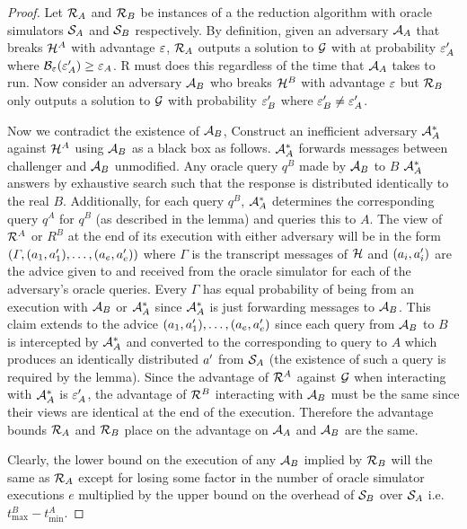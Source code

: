 \begin{proof}
  Let $\mathcal{R}_A$ and $\mathcal{R}_B$ be instances of a the reduction algorithm with oracle simulators $\mathcal{S}_A$ and $\mathcal{S}_B$ respectively.
  By definition, given an adversary $\mathcal{A}_A$ that breaks $\mathcal{H}^A$ with advantage $\varepsilon$, $\mathcal{R}_A$ outputs a solution to $\mathcal{G}$ with at probability $\varepsilon_A'$ where $\mathcal{B}_\varepsilon(\varepsilon_A') \geq \varepsilon_A$.
  R must does this regardless of the time that $\mathcal{A}_A$ takes to run.
  Now consider an adversary $\mathcal{A}_B$ who breaks $\mathcal{H}^B$ with advantage $\varepsilon$ but $\mathcal{R}_B$ only outputs a solution to $\mathcal{G}$ with probability $\varepsilon_B'$ where $\varepsilon_B' \neq \varepsilon_A'$.

  Now we contradict the existence of $\mathcal{A}_B$,
  Construct an inefficient adversary $\mathcal{A}_A^*$ against $\mathcal{H}^A$ using $\mathcal{A}_B$ as a black box as follows.
  $\mathcal{A}_A^*$ forwards messages between challenger and $\mathcal{A}_B$ unmodified.
  Any oracle query $q^B$ made by $\mathcal{A}_B$ to $B$ $\mathcal{A}_A^*$ answers by exhaustive search such that the response is distributed identically to the real $B$.
  Additionally, for each query $q^B$, $\mathcal{A}_A^*$ determines the corresponding query $q^A$ for $q^B$ (as described in the lemma) and queries this to $A$.
  The view of $\mathcal{R}^A$ or $R^B$ at the end of its execution with either adversary will be in the form $(\varGamma, (a_1,a'_1), \dots, (a_e,a'_e))$
  where $\varGamma$ is the transcript messages of $\mathcal{H}$ and $(a_i,a'_i)$ are the advice given to and received from the oracle simulator for each of the adversary's oracle queries.
  Every $\varGamma$ has equal probability of being from an execution with $\mathcal{A}_B$ or $\mathcal{A}_A^*$ since $\mathcal{A}_A^*$ is just forwarding messages to $\mathcal{A}_B$.
  This claim extends to the advice $(a_1,a'_1), \dots, (a_e,a'_e)$ since each query from $\mathcal{A}_B$ to $B$ is intercepted by $\mathcal{A}_A^*$ and converted to the corresponding to query to $A$ which produces an identically distributed $a'$ from $\mathcal{S}_A$ (the existence of such a query is required by the lemma).
  Since the advantage of $\mathcal{R}^A$ against $\mathcal{G}$ when interacting with $\mathcal{A}_A^*$ is $\varepsilon_A'$, the advantage of $\mathcal{R}^B$ interacting with $\mathcal{A}_B$ must be the same since their views are identical at the end of the execution.
  Therefore the advantage bounds $\mathcal{R}_A$ and $\mathcal{R}_B$ place on the advantage on $\mathcal{A}_A$ and $\mathcal{A}_B$ are the same.

  Clearly, the lower bound on the execution of any $\mathcal{A}_B$ implied by $\mathcal{R}_B$ will the same as $\mathcal{R}_A$ except for losing some factor in the number of oracle simulator executions $e$ multiplied by the upper bound on the overhead of $\mathcal{S}_B$ over $\mathcal{S}_A$ i.e. $t^B_{\max} - t^A_{\min}$.
\end{proof}

